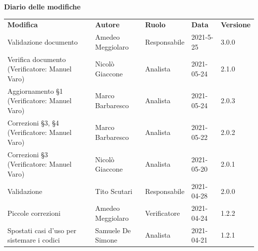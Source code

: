 \documentclass[a4paper]{article}
\begin{document}
\begin{center}
    \centering
    \textbf{\Large Diario delle modifiche}\\
    \vspace{10px}
    \renewcommand{\arraystretch}{1.8}
    \label{tab:RequisitiFunzionali}
    \begin{longtable}[!h]{p{160px} p{90px} p{60px} p{60px} p{50px}}
        \rowcolor{logo!70} \textbf{Modifica}                     & \textbf{Autore}                            & \textbf{Ruolo}                 & \textbf{Data} & \textbf{Versione} \\
        Validazione documento                                    & Amedeo Meggiolaro                          & Responsabile                   & 2021-5-25     & 3.0.0             \\
        Verifica documento \newline (Verificatore: Manuel Varo)  & Nicolò Giaccone                            & Analista                       & 2021-05-24    & 2.1.0             \\
        Aggiornamento \S1 \newline (Verificatore: Manuel Varo)   & Marco Barbaresco                           & Analista                       & 2021-05-24    & 2.0.3             \\
        Correzioni \S3, \S4 \newline (Verificatore: Manuel Varo) & Marco Barbaresco                           & Analista                       & 2021-05-22    & 2.0.2             \\
        Correzioni \S3 \newline (Verificatore: Manuel Varo)      & Nicolò Giaccone                            & Analista                       & 2021-05-20    & 2.0.1             \\
        Validazione                                              & Tito Scutari                               & Responsabile                   & 2021-04-28    & 2.0.0             \\
        Piccole correzioni                                       & Amedeo Meggiolaro                          & Verificatore                   & 2021-04-24    & 1.2.2             \\
        Spostati casi d'uso per sistemare i codici               & Samuele De Simone                          & Analista                       & 2021-04-21    & 1.2.1             \\

\end{longtable}
\end{center}
\end{document}
